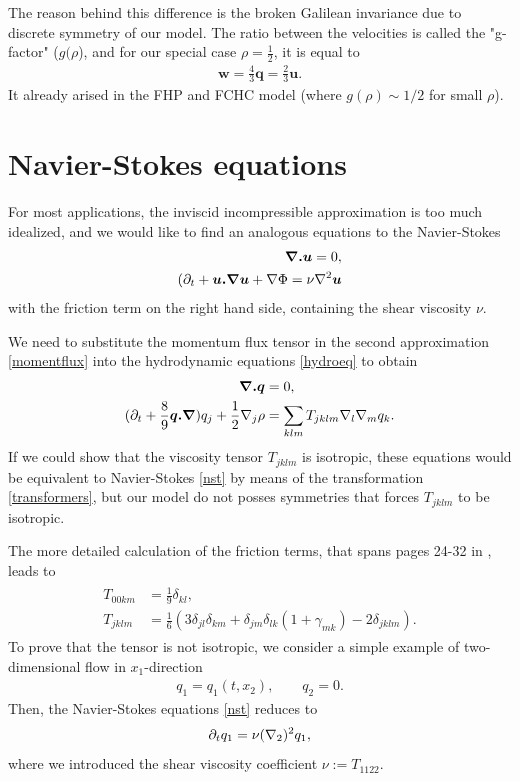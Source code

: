 The reason behind this difference is the broken Galilean invariance due to discrete symmetry of our model.
The ratio between the velocities is called the "g-factor" ($g(\rho$), and for our special case $\rho=\frac{1}{2}$, it is equal to
\begin{align}
\bm{w} = \frac{4}{3} \bm{q} = \frac{2}{3} \bm{u}.
\end{align}
It already arised in the FHP and FCHC model (where $g(\rho) \sim 1/2$ for small $\rho$).

\section{Navier-Stokes equations}
For most applications, the inviscid incompressible approximation is too much idealized,
and we would like to find an analogous equations to the Navier-Stokes
\begin{align} \label{nst}
\begin{split}
\bm{\nabla . u} = 0, \\
(\partial_t + \bm{u.\nabla}\bm{u} + \nabla \Phi = \nu \nabla^2 \bm{u}
\end{split}
\end{align}
with the friction term on the right hand side, containing the shear viscosity $\nu$.

We need to substitute the momentum flux tensor in the second approximation \ref{momentflux} into the hydrodynamic equations \ref{hydroeq} to obtain
\begin{align}
\begin{split}
\bm{\nabla . q} &= 0,\\ 
(\partial_t + \frac{8}{9} \bm{q . \nabla}) q_j + \frac{1}{2}\nabla_j\rho &= \sum_{klm} T_{jklm}\nabla_l \nabla_m q_k.
\end{split}
\end{align}
If we could show that the viscosity tensor $T_{jklm}$ is isotropic, these equations would be equivalent to Navier-Stokes \ref{nst} by means of the transformation \ref{transformers}, but our model do not posses symmetries that forces $T_{jklm}$ to be isotropic.

The more detailed calculation of the friction terms, that spans pages 24-32 in \cite{nasilowski}, leads to
\begin{align} \label{vistens}
\begin{split}
T_{00km} &= \frac{1}{9} \delta_{kl}, \\
T_{jklm} &= \frac{1}{6} (3 \delta_{jl}\delta_{km} + \delta_{jm} \delta_{lk}(1 + \gamma_{mk}) - 2 \delta_{jklm}).
\end{split}
\end{align}
To prove that the tensor is not isotropic, we consider a simple example of two-dimensional flow in $x_1$-direction
\begin{align}
q_1 = q_1(t,x_2), \qquad q_2 = 0.
\end{align}
Then, the Navier-Stokes equations \ref{nst} reduces to 
\begin{align}
\partial_t q_1 = \nu (\nabla_2)^2 q_1,
\end{align}
where we introduced the shear viscosity coefficient $\nu := T_{1122}$.

